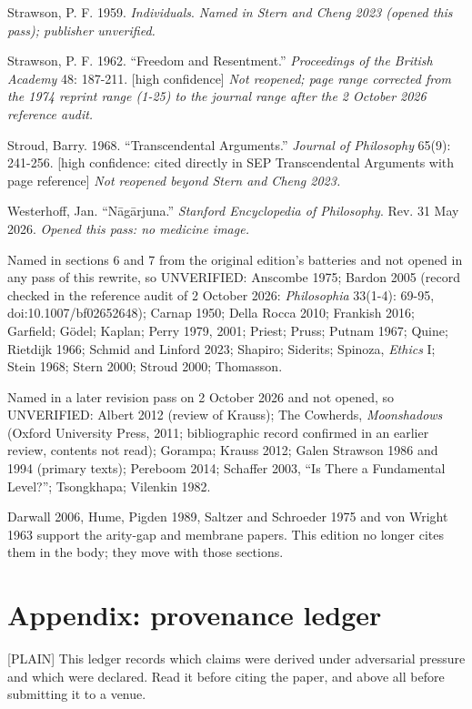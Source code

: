 \documentclass[11pt]{article}
\newcommand{\register}[1]{{\ttfamily\small #1}}
\begin{document}
Strawson, P. F. 1959. \emph{Individuals}. \emph{Named in Stern and Cheng 2023 (opened this pass); publisher unverified.}

Strawson, P. F. 1962. ``Freedom and Resentment.'' \emph{Proceedings of the British Academy} 48: 187-211. [high confidence] \emph{Not reopened; page range corrected from the 1974 reprint range (1-25) to the journal range after the 2 October 2026 reference audit.}

Stroud, Barry. 1968. ``Transcendental Arguments.'' \emph{Journal of Philosophy} 65(9): 241-256. [high confidence: cited directly in SEP Transcendental Arguments with page reference] \emph{Not reopened beyond Stern and Cheng 2023.}

Westerhoff, Jan. ``Nāgārjuna.'' \emph{Stanford Encyclopedia of Philosophy}. Rev. 31 May 2026. \emph{Opened this pass: no medicine image.}

Named in sections 6 and 7 from the original edition's batteries and not opened in any pass of this rewrite, so UNVERIFIED: Anscombe 1975; Bardon 2005 (record checked in the reference audit of 2 October 2026: \emph{Philosophia} 33(1-4): 69-95, doi:10.1007/\allowbreak{}bf02652648); Carnap 1950; Della Rocca 2010; Frankish 2016; Garfield; Gödel; Kaplan; Perry 1979, 2001; Priest; Pruss; Putnam 1967; Quine; Rietdijk 1966; Schmid and Linford 2023; Shapiro; Siderits; Spinoza, \emph{Ethics} I; Stein 1968; Stern 2000; Stroud 2000; Thomasson.

Named in a later revision pass on 2 October 2026 and not opened, so UNVERIFIED: Albert 2012 (review of Krauss); The Cowherds, \emph{Moonshadows} (Oxford University Press, 2011; bibliographic record confirmed in an earlier review, contents not read); Gorampa; Krauss 2012; Galen Strawson 1986 and 1994 (primary texts); Pereboom 2014; Schaffer 2003, ``Is There a Fundamental Level?''; Tsongkhapa; Vilenkin 1982.

Darwall 2006, Hume, Pigden 1989, Saltzer and Schroeder 1975 and von Wright 1963 support the arity-gap and membrane papers. This edition no longer cites them in the body; they move with those sections.

\section*{Appendix: provenance ledger}

\register{[PLAIN]} This ledger records which claims were derived under adversarial pressure and which were declared. Read it before citing the paper, and above all before submitting it to a venue.
\end{document}
